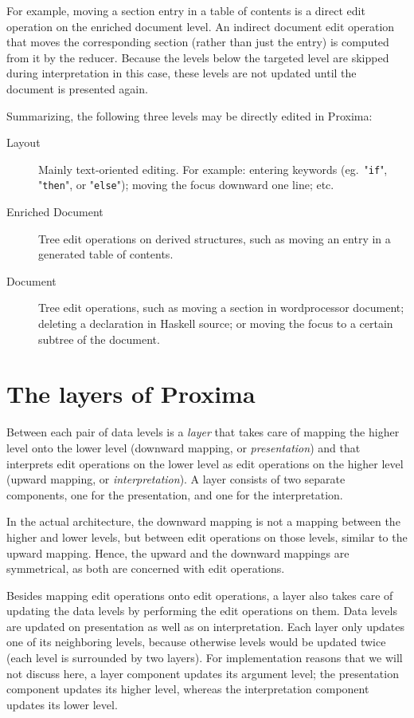 \bc %
For example, moving a section entry in a table of contents is a direct edit operation on the enriched document level. An indirect document edit operation that moves the corresponding section (rather than just the entry) is computed from it by the reducer. Because the levels below the targeted level are skipped during interpretation in this case, these levels are not updated until the document is presented again.  \ec

\bigskip

Summarizing, the following three levels may be directly edited in Proxima:

\begin{description}
\item[Layout] Mainly text-oriented editing. For example: entering keywords (eg.\ "\verb|if|", "\verb|then|", or "\verb|else|"); moving the focus downward one line; etc.
\item[Enriched Document] Tree edit operations on derived structures, such as moving an entry in a generated table of contents.
\item[Document] Tree edit operations, such as moving a section in wordprocessor document; deleting a declaration in Haskell source; or moving the focus to a certain subtree of the document.
\end{description}






%																
%																
%																
\section{The layers of Proxima} \label{sect:archProximaLayers}

Between each pair of data levels is a {\em layer} that takes care of mapping the higher level onto the lower level (downward mapping, or {\em presentation}) and that interprets edit operations on the lower level as edit operations on the higher level (upward mapping, or {\em interpretation}). A layer consists of two separate components, one for the presentation, and one for the interpretation. 

In the actual architecture, the downward mapping is not a mapping between the higher and lower levels, but between edit operations on those levels, similar to the upward mapping. Hence, the upward and the downward mappings are symmetrical, as both are concerned with edit operations. 

Besides mapping edit operations onto edit operations, a layer also takes care of updating the data levels by performing the edit operations on them. Data levels are updated on presentation as well as on interpretation. Each layer only updates one of its neighboring levels, because otherwise levels would be updated twice (each level is surrounded by two layers). For implementation reasons that we will not discuss here, a layer component updates its argument level; the presentation component updates its higher level, whereas the interpretation component updates its lower level. 

